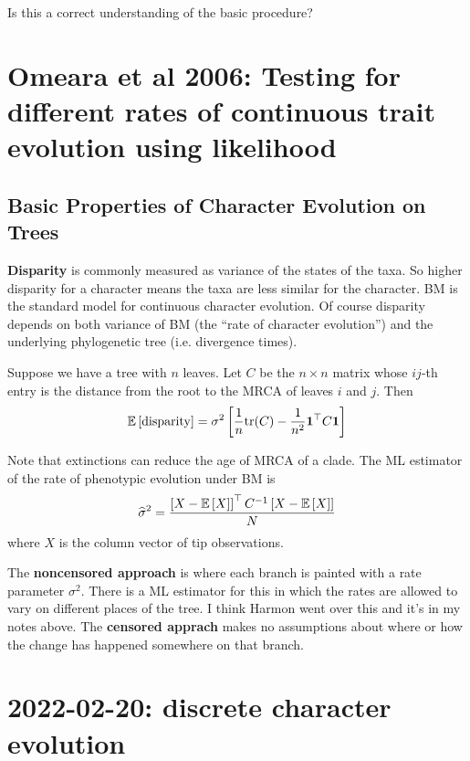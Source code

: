 \documentclass{article}
\def\[{\left [} \def\]{\right ]} \def\({\left (} \def\){\right )}
\begin{document}
Is this a correct understanding of the basic procedure?


\section{Omeara et al 2006: Testing for different rates of continuous trait evolution using likelihood}
\subsection{Basic Properties of Character Evolution on Trees}

\textbf{Disparity} is commonly measured as variance of the states of the taxa. So higher disparity for a character means the taxa are less similar for the character. BM is the standard model for continuous character evolution. Of course disparity depends on both variance of BM (the ``rate of character evolution'') and the underlying phylogenetic tree (i.e. divergence times).

Suppose we have a tree with $n$ leaves. Let $C$ be the $n\times n$ matrix whose $ij$-th entry is the distance from the root to the MRCA of leaves $i$ and $j$. Then
\begin{equation*}
  \E\[ \mathrm{disparity}\]= \sigma^{2}\left[ \frac{1}{n} \mathrm{tr}(C) - \frac{1}{n^{2}} \mathbf{1}^{\top}C \mathbf{1} \right]
\end{equation*}


Note that extinctions can reduce the age of MRCA of a clade. The ML estimator of the rate of phenotypic evolution under BM is
\begin{equation*}
  \widehat{\sigma}^{2} =  \frac{\left[ X-\E\[X \]  \right]^{\top} C^{-1}\left[ X-\E\[X \]  \right]}{N}
\end{equation*}
where $X$ is the column vector of tip observations.


The \textbf{noncensored approach} is where each branch is painted with a rate parameter $\sigma^2$. There is a ML estimator for this in which the rates are allowed to vary on different places of the tree. I think Harmon went over this and it's in my notes above. The \textbf{censored apprach} makes no assumptions about where or how the change has happened somewhere on that branch. 



\section{2022-02-20: discrete character evolution}
\end{document}
